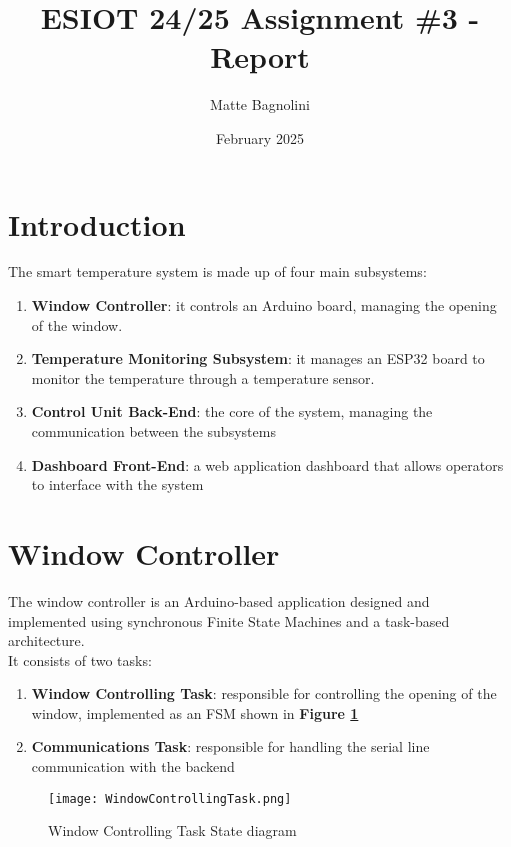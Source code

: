 \documentclass{article}
\title{ESIOT 24/25 Assignment \#3 - Report}
\author{Matte Bagnolini}
\date{February 2025}
\begin{document}
\maketitle

\section{Introduction}
The smart temperature system is made up of four main subsystems:
\begin{enumerate}
    \item \textbf{Window Controller}: it controls an Arduino board, managing the opening of the window.
    \item \textbf{Temperature Monitoring Subsystem}: it manages an ESP32 board to monitor the temperature through a temperature sensor.
    \item \textbf{Control Unit Back-End}: the core of the system, managing the communication between the subsystems
    \item \textbf{Dashboard Front-End}: a web application dashboard that allows operators to interface with the system
\end{enumerate}

\newpage

\section{Window Controller}
The window controller is an Arduino-based application designed and implemented using synchronous Finite State Machines and a task-based architecture.\\
It consists of two tasks: 
\begin{enumerate}
    \item \textbf{Window Controlling Task}: responsible for controlling the opening of the window, implemented as an FSM shown in \textbf{Figure \ref{fig:window controlling task}}
    \item \textbf{Communications Task}: responsible for handling the serial line communication with the backend
\end{enumerate}
\begin{figure}[htp]
    \centering
    \texttt{[image: WindowControllingTask.png]}
    \caption{Window Controlling Task State diagram }
    \label{fig:window controlling task}
\end{figure}
\end{document}
